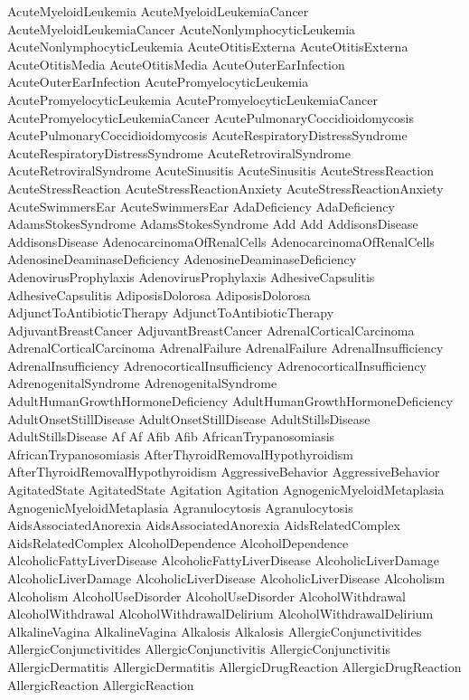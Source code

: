  AcuteMyeloidLeukemia
 AcuteMyeloidLeukemiaCancer
 AcuteMyeloidLeukemiaCancer
 AcuteNonlymphocyticLeukemia
 AcuteNonlymphocyticLeukemia
 AcuteOtitisExterna
 AcuteOtitisExterna
 AcuteOtitisMedia
 AcuteOtitisMedia
 AcuteOuterEarInfection
 AcuteOuterEarInfection
 AcutePromyelocyticLeukemia
 AcutePromyelocyticLeukemia
 AcutePromyelocyticLeukemiaCancer
 AcutePromyelocyticLeukemiaCancer
 AcutePulmonaryCoccidioidomycosis
 AcutePulmonaryCoccidioidomycosis
 AcuteRespiratoryDistressSyndrome
 AcuteRespiratoryDistressSyndrome
 AcuteRetroviralSyndrome
 AcuteRetroviralSyndrome
 AcuteSinusitis
 AcuteSinusitis
 AcuteStressReaction
 AcuteStressReaction
 AcuteStressReactionAnxiety
 AcuteStressReactionAnxiety
 AcuteSwimmersEar
 AcuteSwimmersEar
 AdaDeficiency
 AdaDeficiency
 AdamsStokesSyndrome
 AdamsStokesSyndrome
 Add
 Add
 AddisonsDisease
 AddisonsDisease
 AdenocarcinomaOfRenalCells
 AdenocarcinomaOfRenalCells
 AdenosineDeaminaseDeficiency
 AdenosineDeaminaseDeficiency
 AdenovirusProphylaxis
 AdenovirusProphylaxis
 AdhesiveCapsulitis
 AdhesiveCapsulitis
 AdiposisDolorosa
 AdiposisDolorosa
 AdjunctToAntibioticTherapy
 AdjunctToAntibioticTherapy
 AdjuvantBreastCancer
 AdjuvantBreastCancer
 AdrenalCorticalCarcinoma
 AdrenalCorticalCarcinoma
 AdrenalFailure
 AdrenalFailure
 AdrenalInsufficiency
 AdrenalInsufficiency
 AdrenocorticalInsufficiency
 AdrenocorticalInsufficiency
 AdrenogenitalSyndrome
 AdrenogenitalSyndrome
 AdultHumanGrowthHormoneDeficiency
 AdultHumanGrowthHormoneDeficiency
 AdultOnsetStillDisease
 AdultOnsetStillDisease
 AdultStillsDisease
 AdultStillsDisease
 Af
 Af
 Afib
 Afib
 AfricanTrypanosomiasis
 AfricanTrypanosomiasis
 AfterThyroidRemovalHypothyroidism
 AfterThyroidRemovalHypothyroidism
 AggressiveBehavior
 AggressiveBehavior
 AgitatedState
 AgitatedState
 Agitation
 Agitation
 AgnogenicMyeloidMetaplasia
 AgnogenicMyeloidMetaplasia
 Agranulocytosis
 Agranulocytosis
 AidsAssociatedAnorexia
 AidsAssociatedAnorexia
 AidsRelatedComplex
 AidsRelatedComplex
 AlcoholDependence
 AlcoholDependence
 AlcoholicFattyLiverDisease
 AlcoholicFattyLiverDisease
 AlcoholicLiverDamage
 AlcoholicLiverDamage
 AlcoholicLiverDisease
 AlcoholicLiverDisease
 Alcoholism
 Alcoholism
 AlcoholUseDisorder
 AlcoholUseDisorder
 AlcoholWithdrawal
 AlcoholWithdrawal
 AlcoholWithdrawalDelirium
 AlcoholWithdrawalDelirium
 AlkalineVagina
 AlkalineVagina
 Alkalosis
 Alkalosis
 AllergicConjunctivitides
 AllergicConjunctivitides
 AllergicConjunctivitis
 AllergicConjunctivitis
 AllergicDermatitis
 AllergicDermatitis
 AllergicDrugReaction
 AllergicDrugReaction
 AllergicReaction
 AllergicReaction
